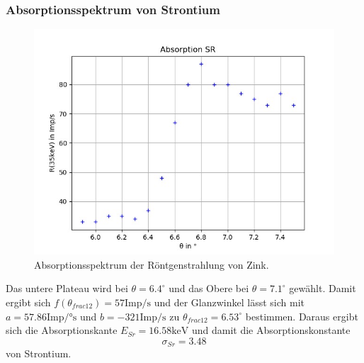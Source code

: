 \subsubsection*{Absorptionsspektrum von Strontium}
\begin{figure}[H]
  \centering
  \includegraphics{content/Sr.png}
  \caption{Absorptionsspektrum der Röntgenstrahlung von Zink.}
  \label{fig:sr}
\end{figure}
Das untere Plateau wird bei $\theta=6.4^\circ$ und das Obere bei $\theta=7.1^\circ$ gewählt. Damit ergibt sich $f(\theta_{frac{1}{2}})=57 \textrm{Imp/s}$ und der Glanzwinkel lässt sich mit $a=57.86 \textrm{Imp/°s}$ und $b=-321 \textrm{Imp/s}$ zu $\theta_{frac{1}{2}}=6.53^\circ$ bestimmen. Daraus ergibt sich die Absorptionskante $E_{Sr}=16.58 \textrm{keV}$ und damit die Absorptionskonstante
\begin{equation*}
  \sigma_{Sr}=3.48
\end{equation*}
von Strontium.
  

